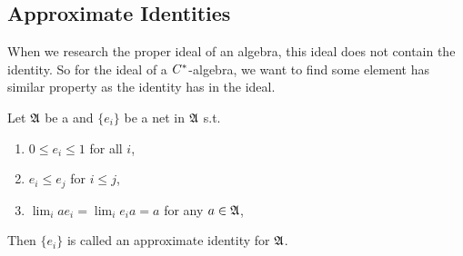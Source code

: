 \documentclass[a4paper,11pt]{report}
\begin{document}
\subsection{Approximate Identities}

When we research the proper ideal of an algebra, this ideal does not contain the identity. So for the ideal of a $C^{*}$-algebra, we want to find some element has similar property as the identity has in the ideal.

\begin{defn}
	Let $\mathfrak{A}$ be a \Cs and $\{e_i\}$ be a net in $\mathfrak{A}$ s.t.
	\begin{enumerate}[label=\arabic*)]
		\item $0 \leqslant e_i \leqslant 1$ for all $i$,
		\item $e_i \leqslant e_j$ for $i \leqslant j$,
		\item $\lim_{i} ae_i = \lim_{i} e_ia = a$ for any $a \in \mathfrak{A}$,
	\end{enumerate}
	Then $\{e_i\}$ is called an approximate identity for $\mathfrak{A}$.
\end{defn}
\end{document}
